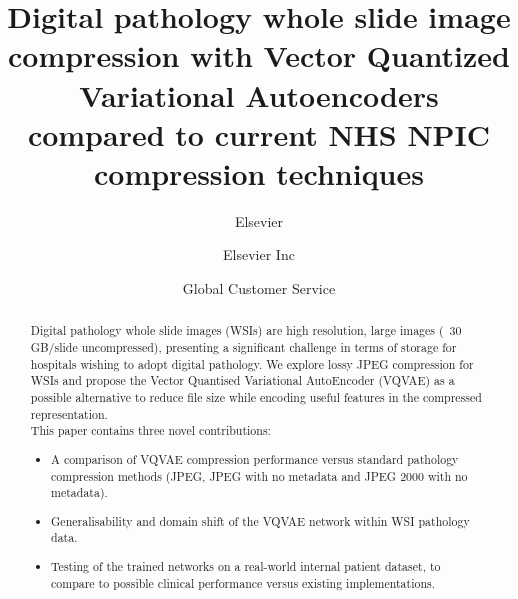 \documentclass[review]{elsarticle}
\begin{document}
\begin{frontmatter}

\title{Digital pathology whole slide image compression with Vector Quantized Variational Autoencoders compared to current NHS NPIC compression techniques}
\tnotetext[mytitlenote]{}

\author{Elsevier}
\address{Radarweg 29, Amsterdam}

\author[mymainaddress,mysecondaryaddress]{Elsevier Inc}

\author[mysecondaryaddress]{Global Customer Service}

\address[mymainaddress]{1600 John F Kennedy Boulevard, Philadelphia}
\address[mysecondaryaddress]{360 Park Avenue South, New York}

\begin{abstract}
Digital pathology whole slide images (WSIs) are high resolution, large images (~30 GB/slide uncompressed), presenting a significant challenge in terms of storage for hospitals wishing to adopt digital pathology. We explore lossy JPEG compression for WSIs and propose the Vector Quantised Variational AutoEncoder (VQVAE) as a possible alternative to reduce file size while encoding useful features in the compressed representation. \\
This paper contains three novel contributions:
\begin{itemize}
    \item A comparison of VQVAE compression performance versus standard pathology compression methods (JPEG, JPEG with no metadata and JPEG 2000 with no metadata).
    \item Generalisability and domain shift of the VQVAE network within WSI pathology data.
    \item Testing of the trained networks on a real-world internal patient dataset, to compare to possible clinical performance versus existing implementations.
\end{itemize}


\end{abstract}
\end{frontmatter}
\end{document}

